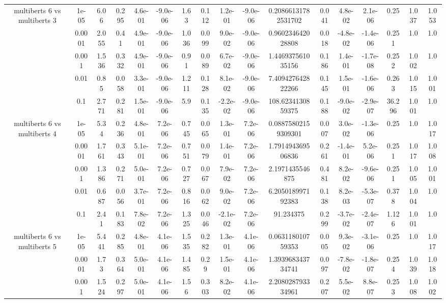 \begin{tabular}{|c|c|c|c|c|c|c|c|c|c|c|c|c|c|c|c|c|}
\hline
\multirow{5}{*}{multiberts 6 vs multiberts 3} & 1e-05 & 6.06 & 0.295 & 4.6e-01 & -9.0e-06 & 1.63 & 0.112 & 1.2e-01 & -9.0e-06 & 0.20866131782531702 & 0.041 & 4.8e-02 & 2.1e-06 & 0.25 & 1.037 & 1.053 \\
 & 0.0001 & 2.055 & 0.41 & 4.9e-01 & -9.0e-06 & 1.036 & 0.099 & 9.0e-02 & -9.0e-06 & 0.960234642028808 & 0.018 & -4.8e-02 & -1.4e-06 & 0.251 & 1.0 & 1.0 \\
 & 0.001 & 1.536 & 0.332 & 4.9e-01 & -9.0e-06 & 0.91 & 0.089 & 6.7e-02 & -9.0e-06 & 1.446937561035156 & 0.186 & 1.4e-01 & -1.7e-08 & 0.252 & 1.002 & 1.0 \\
 & 0.01 & 0.85 & 0.058 & 3.3e-01 & -9.0e-06 & 1.211 & 0.128 & 8.1e-02 & -9.0e-06 & 7.409427642822266 & 0.145 & 1.5e-01 & -1.6e-06 & 0.263 & 1.015 & 1.001 \\
 & 0.1 & 2.771 & 0.281 & 1.5e-01 & -9.0e-06 & 5.9 & 0.135 & -2.2e-02 & -9.0e-06 & 108.6234130859375 & 0.188 & -9.0e-02 & -2.9e-07 & 36.296 & 1.001 & 1.0 \\
\hline
\multirow{5}{*}{multiberts 6 vs multiberts 4} & 1e-05 & 5.34 & 0.236 & 4.8e-01 & 7.2e-06 & 0.745 & 0.065 & 1.3e-01 & 7.2e-06 & 0.08875802159309301 & 0.007 & 3.0e-02 & -1.3e-06 & 0.25 & 1.0 & 1.017 \\
 & 0.0001 & 1.761 & 0.343 & 5.1e-01 & 7.2e-06 & 0.751 & 0.079 & 1.4e-01 & 7.2e-06 & 1.791494369506836 & 0.261 & -1.4e-01 & 5.2e-06 & 0.251 & 1.017 & 1.008 \\
 & 0.001 & 1.386 & 0.271 & 5.0e-01 & 7.2e-06 & 0.727 & 0.067 & 7.9e-02 & 7.2e-06 & 2.1971435546875 & 0.481 & 8.2e-02 & -9.6e-06 & 0.251 & 1.005 & 1.001 \\
 & 0.01 & 0.687 & 0.056 & 3.7e-01 & 7.2e-06 & 0.816 & 0.062 & 9.0e-02 & 7.2e-06 & 6.205018997192383 & 0.138 & 8.2e-03 & -5.3e-07 & 0.378 & 1.004 & 1.0 \\
 & 0.1 & 2.41 & 0.183 & 7.8e-02 & 7.2e-06 & 1.325 & 0.046 & -2.1e-02 & 7.2e-06 & 91.234375 & 0.299 & -3.7e-02 & -2.4e-07 & 1.126 & 1.001 & 1.0 \\
\hline
\multirow{5}{*}{multiberts 6 vs multiberts 5} & 1e-05 & 5.441 & 0.285 & 4.8e-01 & 4.1e-06 & 1.535 & 0.282 & 1.3e-01 & 4.1e-06 & 0.063118010759353 & 0.005 & 9.3e-02 & -3.1e-06 & 0.25 & 1.0 & 1.017 \\
 & 0.0001 & 1.73 & 0.364 & 5.0e-01 & 4.1e-06 & 1.485 & 0.29 & 1.5e-01 & 4.1e-06 & 1.393968343734741 & 0.097 & -7.8e-02 & -1.8e-07 & 0.254 & 1.039 & 1.018 \\
 & 0.001 & 1.524 & 0.297 & 5.0e-01 & 4.1e-06 & 1.56 & 0.303 & 8.2e-02 & 4.1e-06 & 2.208028793334961 & 0.207 & 5.5e-02 & 8.8e-07 & 0.253 & 1.008 & 1.002 \\

\end{tabular}
